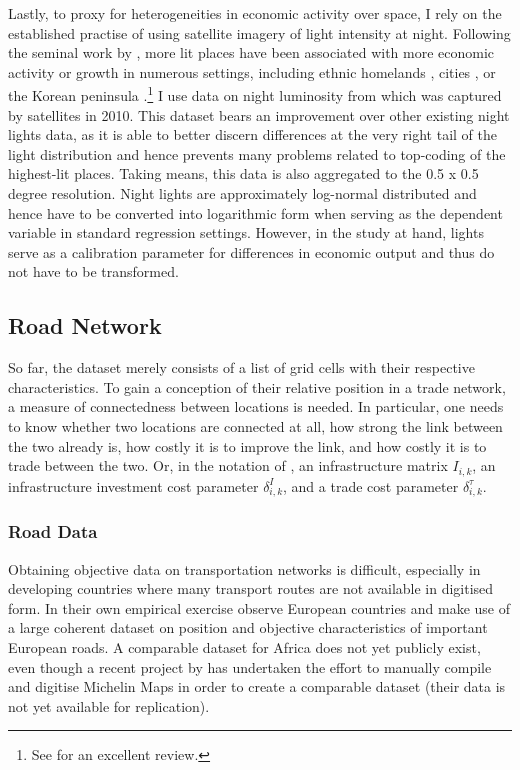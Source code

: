 \documentclass[11pt, oneside]{article}   	%
\begin{document}
Lastly, to proxy for heterogeneities in economic activity over space, I rely on the established practise of using satellite imagery of light intensity at night. Following the seminal work by \cite{henderson_measuring_2012}, more lit places have been associated with more economic activity or growth in numerous settings, including ethnic homelands \citep{MichalopoulosNationalInstitutionsSubnational2014}, cities \citep{storeygard_farther_2016}, or the Korean peninsula \citep{Lee_InternationalIsolationRegional_2016}.\footnote{See \cite{donaldson_view_2016} for an excellent review.} I use data on night luminosity from \cite{henderson_global_2018} which was captured by satellites in 2010. This dataset bears an improvement over other existing night lights data, as it is able to better discern differences at the very right tail of the light distribution and hence prevents many problems related to top-coding of the highest-lit places. Taking means, this data is also aggregated to the 0.5 x 0.5 degree resolution. Night lights are approximately log-normal distributed and hence have to be converted into logarithmic form when serving as the dependent variable in standard regression settings. However, in the study at hand, lights serve as a calibration parameter for differences in economic output and thus do not have to be transformed.

\subsection{Road Network}
So far, the dataset merely consists of a list of grid cells with their respective characteristics. To gain a conception of their relative position in a trade network, a measure of connectedness between locations is needed. In particular, one needs to know whether two locations are connected at all, how strong the link between the two already is, how costly it is to improve the link, and how costly it is to trade between the two. Or, in the notation of \cite{fajgelbaum_optimal_2017}, an infrastructure matrix $I_{i,k}$, an infrastructure investment cost parameter $\delta_{i,k}^{I}$, and a trade cost parameter $\delta_{i,k}^{\tau}$.

\subsubsection{Road Data}
Obtaining objective data on transportation networks is difficult, especially in developing countries where many transport routes are not available in digitised form. In their own empirical exercise \citeauthor{fajgelbaum_optimal_2017} observe European countries and make use of a large coherent dataset on position and objective characteristics of important European roads. A comparable dataset for Africa does not yet publicly exist, even though a recent project by \cite{jedwab_average_2017} has undertaken the effort to manually compile and digitise Michelin Maps in order to create a comparable dataset (their data is not yet available for replication).
\end{document}
